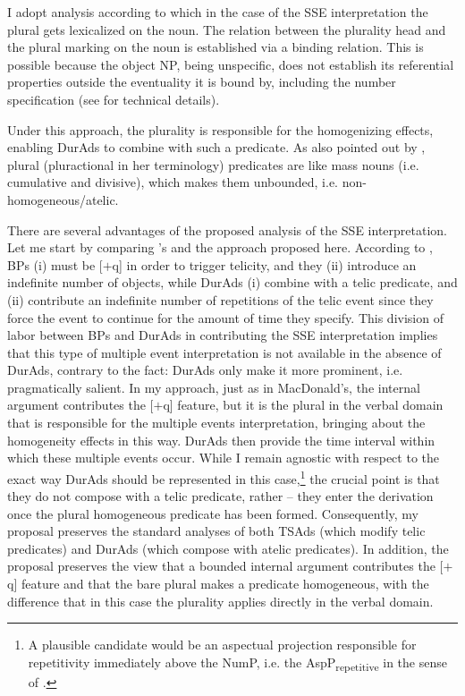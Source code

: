 \documentclass[output=paper,colorlinks,citecolor=brown]{langscibook}
\begin{document}
I adopt  analysis according to which in the case of the SSE interpretation the plural gets lexicalized on the noun. The relation between the plurality head and the plural marking on the noun is established via a binding relation. This is possible because the object NP, being unspecific, does not esta\-blish its referential properties outside the eventuality it is bound by, including the number specification (see \citealt{Arsenijević2006eah} for technical details).

Under this approach, the plurality is responsible for the homogenizing effects, enabling DurAds to combine with such a predicate. As also pointed out by \citet[142--143]{vanGeenhoven2004}, plural (pluractional in her terminology) predicates are like mass nouns (i.e. cumulative and divisive), which makes them unbounded, i.e. non-homogeneous/atelic. 

There are several advantages of the proposed analysis of the SSE interpretation. Let me start by comparing \citeauthor{MacDonald_2008}'s and the approach proposed here. According to \citet[50]{MacDonald_2008}, BPs (i) must be [$+$q] in order to trigger telicity, and they (ii) introduce an indefinite number of objects, while DurAds (i) combine with a telic predicate, and (ii) contribute an indefinite number of repetitions of the telic event since they force the event to continue for the amount of time they specify. This division of labor between BPs and DurAds in contributing the SSE interpretation implies that this type of multiple event interpretation is not available in the absence of DurAds, contrary to the fact: DurAds only make it more prominent, i.e. pragmatically salient. In my approach, just as in MacDonald's, the internal argument contributes the [$+$q] feature, but it is the plural in the verbal domain that is responsible for the multiple events interpretation, bringing about the homogeneity effects in this way. DurAds then provide the time interval within which these multiple events occur. While I remain agnostic with respect to the exact way DurAds should be represented in this case,\footnote{A plausible candidate would be an aspectual projection responsible for repetitivity immediately above the NumP, i.e. the AspP\textsubscript{repetitive} in the sense of \citet[]{Cinque1999}.} the crucial point is that they do not compose with a telic predicate, rather -- they enter the derivation once the plural homogeneous predicate has been formed. Consequently, my proposal preserves the standard analyses of both TSAds (which modify telic predicates) and DurAds (which compose with atelic predicates). In addition, the proposal preserves the view that a bounded internal argument contributes the [$+$q] feature and that the bare plural makes a predicate homogeneous, with the difference that in this case the plurality applies directly in the verbal domain.
\end{document}

